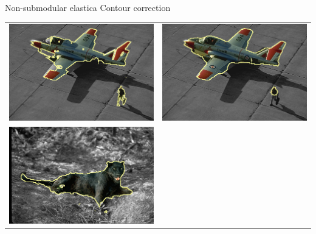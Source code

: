 \begin{frame}
{Non-submodular elastica}
{Contour correction}
\begin{tabular}{cc}
\includegraphics[scale=0.28]{figures/non-submodular-elastica/contour-correction/gc-seg-airplane.png}&
\includegraphics[scale=0.28]{figures/non-submodular-elastica/contour-correction/corrected-seg-airplane.png}\\[1em]
\includegraphics[scale=0.28]{figures/non-submodular-elastica/contour-correction/gc-seg-panther.png}&

\end{tabular}
\end{frame}
